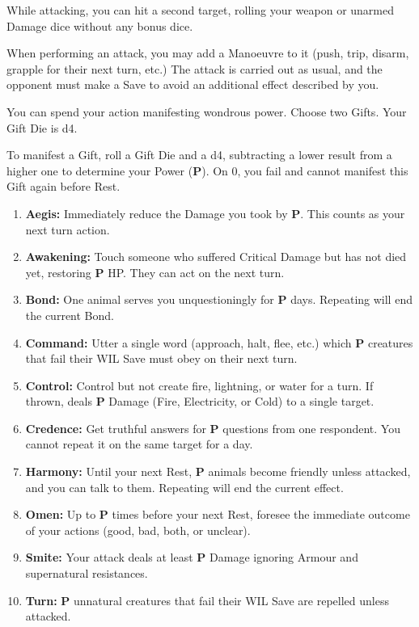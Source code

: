 \documentclass[itdr/core]{subfiles}
\begin{document}
\break

\feathp
While attacking, you can hit a second target, rolling your weapon or unarmed Damage dice without any bonus dice.

\vfill
{}
\feathp
When performing an attack, you may add a Manoeuvre to it (push, trip, disarm, grapple for their next turn, etc.) The attack is carried out as usual, and the opponent must make a Save to avoid an additional effect described by you.

\vfill
{}
\featmt
You can spend your action manifesting wondrous power. Choose two Gifts. Your Gift Die is d4.

To manifest a Gift, roll a Gift Die and a d4, subtracting a lower result from a higher one to determine your Power (\textbf{P}). On 0, you fail and cannot manifest this Gift again before Rest.\tight


\begin{enumerate}
	\item \textbf{Aegis:} Immediately reduce the Damage you took by \textbf{P}. This counts as your next turn action.
	\item \textbf{Awakening:} Touch someone who suffered \mbox{Critical} Damage but has not died yet, restoring \textbf{P} HP. They can act on the next turn.
	\item \textbf{Bond:} One animal serves you unquestioningly for \textbf{P} days. Repeating will end the current Bond.
	\item \textbf{Command:} Utter a single word (approach, halt, flee, etc.) which \textbf{P} creatures that fail their WIL Save must obey on their next turn.
	\item \textbf{Control:} Control but not create fire, lightning, or water for a turn. If thrown, deals \textbf{P} Damage (Fire, Electricity, or Cold) to a single target.
	\item \textbf{Credence:} Get truthful answers for \textbf{P} questions from one respondent. You cannot repeat it on the same target for a day.
	\item \textbf{Harmony:} Until your next Rest, \textbf{P} animals become friendly unless attacked, and you can talk to them. Repeating will end the current effect.
	\item \textbf{Omen:} Up to \textbf{P} times before your next Rest, foresee the immediate outcome of your actions (good, bad, both, or unclear).
	\item \textbf{Smite:} Your attack deals at least \textbf{P} Damage \mbox{ignoring} Armour and supernatural resistances.
	\item \textbf{Turn:} \textbf{P} unnatural creatures that fail their WIL Save are repelled unless attacked.
\end{enumerate}
\end{document}
